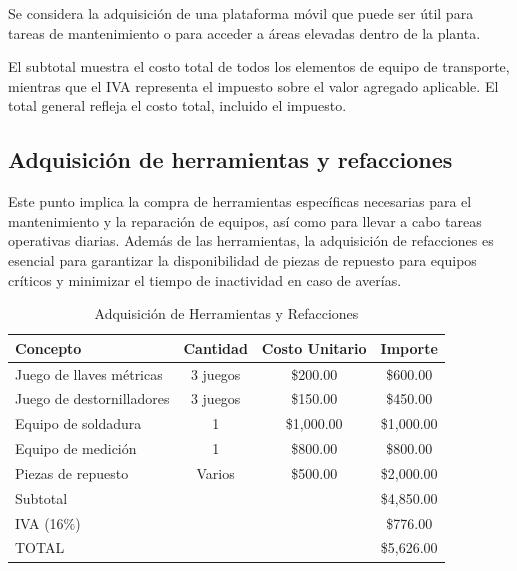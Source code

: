 Se considera la adquisición de una plataforma móvil que puede ser útil para tareas de mantenimiento o para acceder a áreas elevadas dentro de la planta.

El subtotal muestra el costo total de todos los elementos de equipo de transporte, mientras que el IVA representa el impuesto sobre el valor agregado aplicable. El total general refleja el costo total, incluido el impuesto.

\subsection{Adquisición de herramientas y refacciones}

Este punto implica la compra de herramientas específicas necesarias para el mantenimiento y la reparación de equipos, así como para llevar a cabo tareas operativas diarias.
Además de las herramientas, la adquisición de refacciones es esencial para garantizar la disponibilidad de piezas de repuesto para equipos críticos y minimizar el tiempo de inactividad en caso de averías.

\begin{table}[htbp]
    \centering
    \begin{tabular}{|l|c|c|c|}
        \hline
        \textbf{Concepto}               & \textbf{Cantidad} & \textbf{Costo Unitario} & \textbf{Importe} \\
        \hline
        Juego de llaves métricas       & 3 juegos          & \$200.00                 & \$600.00         \\
        Juego de destornilladores      & 3 juegos          & \$150.00                 & \$450.00         \\
        Equipo de soldadura            & 1                 & \$1,000.00               & \$1,000.00       \\
        Equipo de medición             & 1                 & \$800.00                 & \$800.00         \\
        Piezas de repuesto    & Varios            & \$500.00                 & \$2,000.00       \\
        \hline
        Subtotal                       &                   &                          & \$4,850.00       \\
        IVA (16\%)                     &                   &                          & \$776.00         \\
        \hline
        TOTAL                          &                   &                          & \$5,626.00       \\
        \hline
    \end{tabular}
    \caption{Adquisición de Herramientas y Refacciones}
    \label{tab:herramientas_refacciones}
\end{table}


